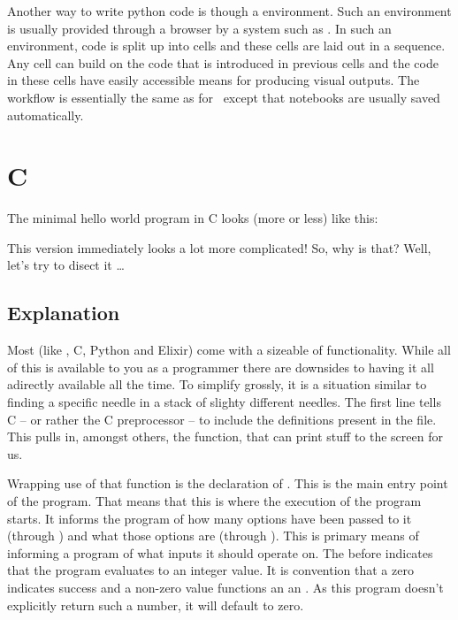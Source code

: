 Another way to write python code is though a  environment. Such an environment is usually provided through a browser by a system such as . In such an environment, code is split up into cells and these cells are laid out in a sequence. Any cell can build on the code that is introduced in previous cells and the code in these cells have easily accessible means for producing visual outputs. The workflow is essentially the same as for \csharp\ except that notebooks are usually saved automatically.

\section{C}

The minimal hello world program in C looks (more or less) like this:


This version immediately looks a lot more complicated! So, why is that? Well, let's try to disect it \ldots

\subsection{Explanation}

Most  (like \csharp, C, Python and Elixir) come with a sizeable  of functionality. While all of this is available to you as a programmer there are downsides to having it all adirectly available all the time. To simplify grossly, it is a situation similar to finding a specific needle in a stack of slighty different needles. The first line tells C -- or rather the C preprocessor -- to include the definitions present in the  file. This pulls in, amongst others, the  function, that can print stuff to the screen for us.

Wrapping use of that  function is the declaration of . This is the main entry point of the program. That means that this is where the execution of the program starts. It informs the program of how many options have been passed to it (through ) and what those options are (through ). This is  primary means of informing a program of what inputs it should operate on. The  before  indicates that the program evaluates to an integer value. It is convention that a zero indicates success and a non-zero value functions an an . As this program doesn't explicitly return such a number, it will default to zero.

